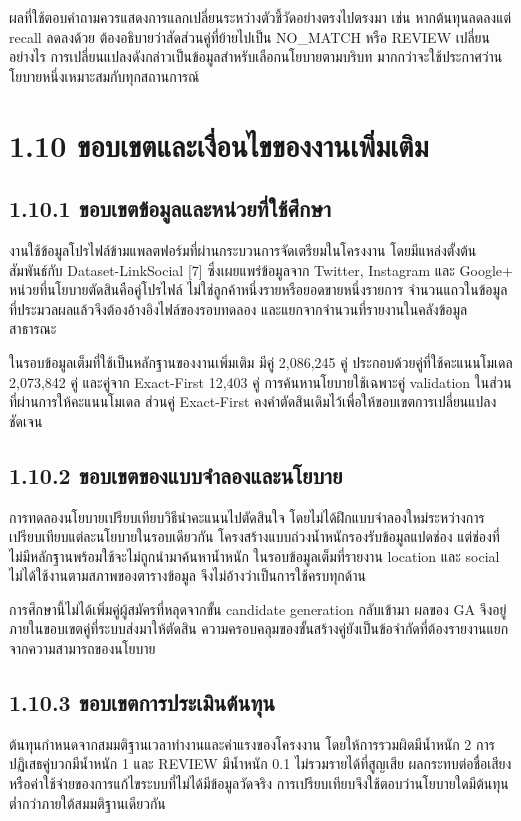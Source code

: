 ผลที่ใช้ตอบคำถามควรแสดงการแลกเปลี่ยนระหว่างตัวชี้วัดอย่างตรงไปตรงมา เช่น หากต้นทุนลดลงแต่ recall ลดลงด้วย ต้องอธิบายว่าสัดส่วนคู่ที่ย้ายไปเป็น NO\_MATCH หรือ REVIEW เปลี่ยนอย่างไร การเปลี่ยนแปลงดังกล่าวเป็นข้อมูลสำหรับเลือกนโยบายตามบริบท มากกว่าจะใช้ประกาศว่านโยบายหนึ่งเหมาะสมกับทุกสถานการณ์

\section*{1.10 ขอบเขตและเงื่อนไขของงานเพิ่มเติม}
\subsection*{1.10.1 ขอบเขตข้อมูลและหน่วยที่ใช้ศึกษา}
งานใช้ข้อมูลโปรไฟล์ข้ามแพลตฟอร์มที่ผ่านกระบวนการจัดเตรียมในโครงงาน โดยมีแหล่งตั้งต้นสัมพันธ์กับ Dataset-LinkSocial [7] ซึ่งเผยแพร่ข้อมูลจาก Twitter, Instagram และ Google+ หน่วยที่นโยบายตัดสินคือคู่โปรไฟล์ ไม่ใช่ลูกค้าหนึ่งรายหรือยอดขายหนึ่งรายการ จำนวนแถวในข้อมูลที่ประมวลผลแล้วจึงต้องอ้างอิงไฟล์ของรอบทดลอง และแยกจากจำนวนที่รายงานในคลังข้อมูลสาธารณะ

ในรอบข้อมูลเต็มที่ใช้เป็นหลักฐานของงานเพิ่มเติม มีคู่ 2,086,245 คู่ ประกอบด้วยคู่ที่ใช้คะแนนโมเดล 2,073,842 คู่ และคู่จาก Exact-First 12,403 คู่ การค้นหานโยบายใช้เฉพาะคู่ validation ในส่วนที่ผ่านการให้คะแนนโมเดล ส่วนคู่ Exact-First คงคำตัดสินเดิมไว้เพื่อให้ขอบเขตการเปลี่ยนแปลงชัดเจน

\subsection*{1.10.2 ขอบเขตของแบบจำลองและนโยบาย}
การทดลองนโยบายเปรียบเทียบวิธีนำคะแนนไปตัดสินใจ โดยไม่ได้ฝึกแบบจำลองใหม่ระหว่างการเปรียบเทียบแต่ละนโยบายในรอบเดียวกัน โครงสร้างแบบถ่วงน้ำหนักรองรับข้อมูลแปดช่อง แต่ช่องที่ไม่มีหลักฐานพร้อมใช้จะไม่ถูกนำมาค้นหาน้ำหนัก ในรอบข้อมูลเต็มที่รายงาน location และ social ไม่ได้ใช้งานตามสภาพของตารางข้อมูล จึงไม่อ้างว่าเป็นการใช้ครบทุกด้าน

การศึกษานี้ไม่ได้เพิ่มคู่ผู้สมัครที่หลุดจากขั้น candidate generation กลับเข้ามา ผลของ GA จึงอยู่ภายในขอบเขตคู่ที่ระบบส่งมาให้ตัดสิน ความครอบคลุมของขั้นสร้างคู่ยังเป็นข้อจำกัดที่ต้องรายงานแยกจากความสามารถของนโยบาย

\subsection*{1.10.3 ขอบเขตการประเมินต้นทุน}
ต้นทุนกำหนดจากสมมติฐานเวลาทำงานและค่าแรงของโครงงาน โดยให้การรวมผิดมีน้ำหนัก 2 การปฏิเสธคู่บวกมีน้ำหนัก 1 และ REVIEW มีน้ำหนัก 0.1 ไม่รวมรายได้ที่สูญเสีย ผลกระทบต่อชื่อเสียง หรือค่าใช้จ่ายของการแก้ไขระบบที่ไม่ได้มีข้อมูลวัดจริง การเปรียบเทียบจึงใช้ตอบว่านโยบายใดมีต้นทุนต่ำกว่าภายใต้สมมติฐานเดียวกัน

